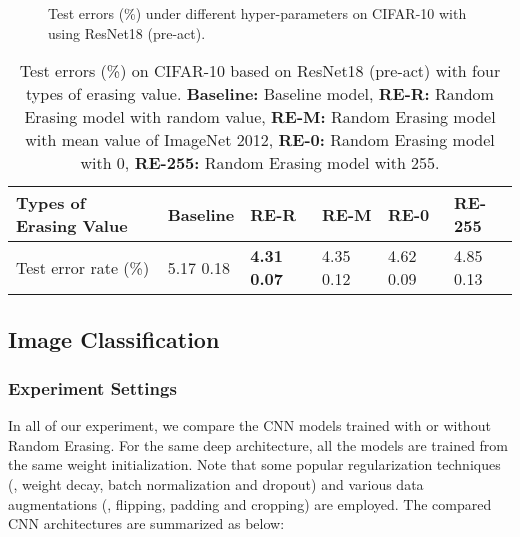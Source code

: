 \documentclass[10pt,twocolumn,letterpaper]{article}
\begin{document}
\begin{figure*}[!t]
\centering
{}
\vspace{-.02in}
\caption{Test errors (\%) under different hyper-parameters on CIFAR-10 with using ResNet18 (pre-act).}
\label{fig:CIFAR-parameter}
\end{figure*}




\begin{table*}
\footnotesize
\begin{center}
\begin{tabularx}{\linewidth}{ l|C|C|C|C|C}
\hline
Types of Erasing Value & Baseline & RE-R & RE-M & RE-0 & RE-255  \\
\hline
\hline
Test error rate (\%)& 5.17  0.18 & \textbf{4.31  0.07} & 4.35  0.12 & 4.62  0.09 & 4.85  0.13\\
\hline
\end{tabularx}
\end{center}
\vspace{-.1in}
\caption{\label{tabel:Erasing Value} Test errors (\%) on CIFAR-10 based on ResNet18 (pre-act) with four types of erasing value. \textbf{Baseline:} Baseline model, \textbf{RE-R:} Random Erasing model with random value, \textbf{RE-M:} Random Erasing model with mean value of ImageNet 2012, \textbf{RE-0:} Random Erasing model with 0, \textbf{RE-255:} Random Erasing model with 255.}
\end{table*}



\subsection{Image Classification}


\subsubsection{Experiment Settings} In all of our experiment, we compare the CNN models trained with or without Random Erasing. For the same deep architecture, all the models are trained from the same weight initialization. Note that some popular regularization techniques (\eg, weight decay, batch normalization and dropout) and various data augmentations (\eg, flipping, padding and cropping) are employed. The compared CNN architectures are summarized as below:
\end{document}
